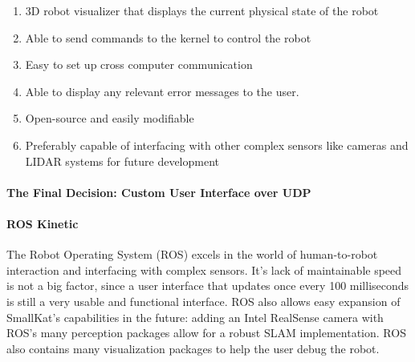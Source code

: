 \begin{enumerate}
    \item 3D robot visualizer that displays the current physical state of the robot
    \item Able to send commands to the kernel to control the robot
    \item Easy to set up cross computer communication
    \item Able to display any relevant error messages to the user.
    \item Open-source and easily modifiable
    \item Preferably capable of interfacing with other complex sensors like cameras and LIDAR systems for future development
\end{enumerate}

\paragraph*{The Final Decision: Custom User Interface over UDP}


\paragraph*{ROS Kinetic}
The Robot Operating System (ROS) excels in the world of human-to-robot interaction and interfacing with complex sensors. It's lack of maintainable speed is not a big factor, since a user interface that updates once every 100 milliseconds is still a very usable and functional interface. ROS also allows easy expansion of SmallKat's capabilities in the future: adding an Intel RealSense camera with ROS's many perception packages allow for a robust SLAM implementation. ROS also contains many visualization packages to help the user debug the robot.



